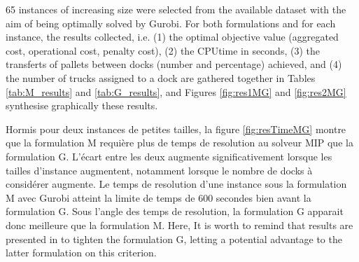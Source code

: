 \documentclass[preprint,12pt,authoryear]{elsarticle}
\begin{document}
65 instances of increasing size were selected from the available dataset with the aim of being optimally solved by Gurobi.
%
For both formulations and for each instance, the results collected, i.e. 
(1) the optimal objective value (aggregated cost, operational cost, penalty cost), 
(2) the CPUtime in seconds,
(3) the transferts of pallets between docks (number and percentage) achieved,   and
(4) the number of trucks assigned to a dock
are gathered together in Tables \ref{tab:M_results} and \ref{tab:G_results}, and Figures \ref{fig:res1MG} and \ref{fig:res2MG} synthesise  graphically these results.

\color{red}


Hormis pour deux instances de petites tailles, la figure \ref{fig:resTimeMG} montre que la formulation M requière plus de temps de resolution au solveur MIP que la formulation G.
L'écart entre les deux augmente significativement lorsque les tailles d'instance augmentent, notamment lorsque le nombre de docks à considérer augmente.
Le temps de resolution d'une instance sous la formulation M avec Gurobi atteint la limite de temps de 600 secondes bien avant la formulation G.
Sous l'angle des temps de resolution, la formulation G apparait donc meilleure que la formulation M.
Here, It is worth to remind that results are presented in \citep{Gelareh2015,GELAREH2016} to tighten the formulation G, letting a potential advantage to the latter formulation on this criterion.


\end{document}
